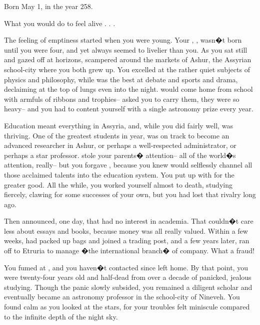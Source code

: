 \documentclass[char]{Kos}
\begin{document}
\name{\cAnarchist{}}

Born May 1, in the year 258.

What you would do to feel alive . . .

The feeling of emptiness started when you were young. Your \cMerchant{\sibling}, \cMerchant{\nickname}, wasn�t born until you were four, and yet \cMerchant{\they} always seemed to livelier than you. As you sat still and gazed off at horizons, \cMerchant{\they} scampered around the markets of Ashur, the Assyrian school-city where you both grew up. You excelled at the rather quiet subjects of physics and philosophy, while \cMerchant{\they} was the best at debate and sports and drama, declaiming at the top of \cMerchant{\their} lungs even into the night. \cMerchant{\They} would come home from school with armfuls of ribbons and trophies-- \cMerchant{\they} asked you to carry them, they were so heavy-- and you had to content yourself with a single astronomy prize every year.

Education meant everything in Assyria, and, while you did fairly well, \cMerchant{\nickname} was thriving. One of the greatest students in \cMerchant{\their} year, \cMerchant{\they} was on track to become an advanced researcher in Ashur, or perhaps a well-respected administrator, or perhaps a star professor. \cMerchant{\They} stole your parents� attention-- all of the world�s attention, really-- but you forgave \cMerchant{\them}, because you knew \cMerchant{\they} would selflessly channel all those acclaimed talents into the education system. You put up with \cMerchant{\them} for the greater good. All the while, you worked yourself almost to death, studying fiercely, clawing for some successes of your own, but you had lost that rivalry long ago.

Then \cMerchant{\they} announced, one day, that \cMerchant{\they} had no interest in academia. That \cMerchant{\they} couldn�t care less about essays and books, because money was all \cMerchant{\they} really valued. Within a few weeks, \cMerchant{\they} had packed up \cMerchant{\their} bags and joined a trading post, and a few years later, \cMerchant{\they} ran off to Etruria to manage �the international branch� of \cMerchant{\their} company. What a fraud!

You fumed at \cMerchant{\them}, and you haven�t contacted \cMerchant{\them} since \cMerchant{\they} left home. By that point, you were twenty-four years old and half-dead from over a decade of panicked, jealous studying. Though the panic slowly subsided, you remained a diligent scholar and eventually became an astronomy professor in the school-city of Nineveh. You found calm as you looked at the stars, for your troubles felt miniscule compared to the infinite depth of the night sky.
\end{document}
